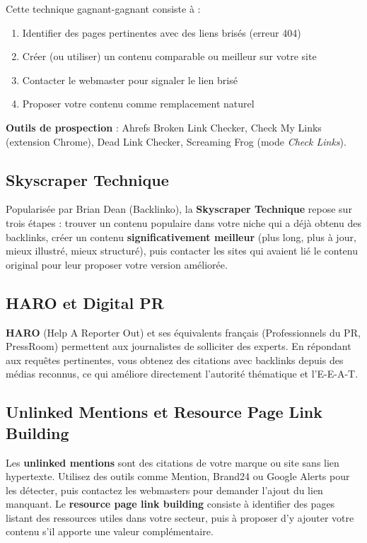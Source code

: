 \documentclass[12pt,a4paper,twoside]{report}
\newcommand{\keyword}[1]{\textbf{\textcolor{googleblue}{#1}}}
\begin{document}
Cette technique gagnant-gagnant consiste à :

\begin{enumerate}
    \item Identifier des pages pertinentes avec des liens brisés (erreur 404)
    \item Créer (ou utiliser) un contenu comparable ou meilleur sur votre site
    \item Contacter le webmaster pour signaler le lien brisé
    \item Proposer votre contenu comme remplacement naturel
\end{enumerate}

\textbf{Outils de prospection} : Ahrefs Broken Link Checker, Check My Links (extension Chrome), Dead Link Checker, Screaming Frog (mode \textit{Check Links}).

\subsection{Skyscraper Technique}

Popularisée par Brian Dean (Backlinko), la \keyword{Skyscraper Technique} repose sur trois étapes : trouver un contenu populaire dans votre niche qui a déjà obtenu des backlinks, créer un contenu \textbf{significativement meilleur} (plus long, plus à jour, mieux illustré, mieux structuré), puis contacter les sites qui avaient lié le contenu original pour leur proposer votre version améliorée.

\subsection{HARO et Digital PR}

\keyword{HARO} (Help A Reporter Out) et ses équivalents français (Professionnels du PR, PressRoom) permettent aux journalistes de solliciter des experts. En répondant aux requêtes pertinentes, vous obtenez des citations avec backlinks depuis des médias reconnus, ce qui améliore directement l'autorité thématique et l'E-E-A-T.

\subsection{Unlinked Mentions et Resource Page Link Building}

Les \keyword{unlinked mentions} sont des citations de votre marque ou site sans lien hypertexte. Utilisez des outils comme Mention, Brand24 ou Google Alerts pour les détecter, puis contactez les webmasters pour demander l'ajout du lien manquant. Le \keyword{resource page link building} consiste à identifier des pages listant des ressources utiles dans votre secteur, puis à proposer d'y ajouter votre contenu s'il apporte une valeur complémentaire.
\end{document}
